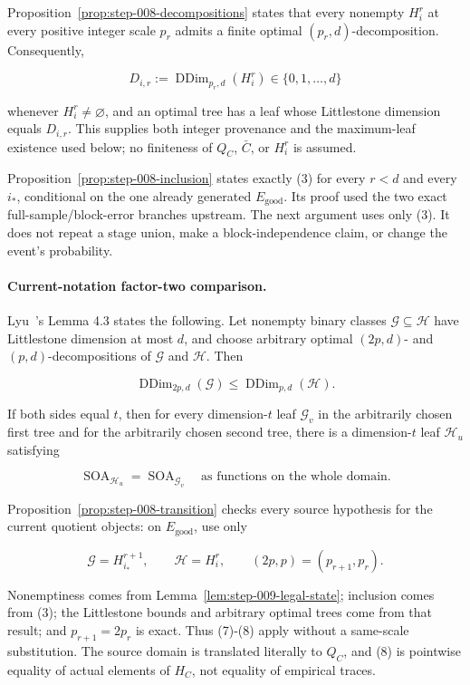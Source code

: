 Proposition~\ref{prop:step-008-decompositions} states that every
nonempty \(H_i^r\) at every positive integer scale \(p_r\) admits a finite
optimal \((p_r,d)\)-decomposition. Consequently,

\[
 D_{i,r}:=\operatorname{DDim}_{p_r,d}(H_i^r)
 \in\{0,1,\ldots,d\}
 \tag{6}
\]

whenever \(H_i^r\ne\varnothing\), and an optimal tree has a leaf whose
Littlestone dimension equals \(D_{i,r}\). This supplies both integer
provenance and the maximum-leaf existence used below; no finiteness of
\(Q_C\), \(\bar C\), or \(H_i^r\) is assumed.

Proposition~\ref{prop:step-008-inclusion} states exactly (3) for
every \(r<d\) and every \(i_*\), conditional on the one already generated
\(E_{\mathrm{good}}\). Its proof used the two exact full-sample/block-error
branches upstream. The next argument uses only (3). It does not repeat a stage
union, make a block-independence claim, or change the event's probability.

\paragraph{Current-notation factor-two comparison.}

Lyu~\citep{lyu2025}'s Lemma 4.3 states the
following. Let nonempty binary classes
\(\mathcal G\subseteq\mathcal H\) have Littlestone dimension at most \(d\),
and choose arbitrary optimal \((2p,d)\)- and \((p,d)\)-decompositions of
\(\mathcal G\) and \(\mathcal H\). Then

\[
 \operatorname{DDim}_{2p,d}(\mathcal G)
 \leq\operatorname{DDim}_{p,d}(\mathcal H).
 \tag{7}
\]

If both sides equal \(t\), then for every dimension-\(t\) leaf
\(\mathcal G_v\) in the arbitrarily chosen first tree and for the
arbitrarily chosen second tree, there is a dimension-\(t\) leaf
\(\mathcal H_u\) satisfying

\[
 \operatorname{SOA}_{\mathcal H_u}
 =\operatorname{SOA}_{\mathcal G_v}
 \quad\text{as functions on the whole domain}.
 \tag{8}
\]

Proposition~\ref{prop:step-008-transition} checks every source
hypothesis for the current quotient objects: on \(E_{\mathrm{good}}\), use
only

\[
 \mathcal G=H_{i_*}^{r+1},\qquad
 \mathcal H=H_i^r,\qquad
 (2p,p)=(p_{r+1},p_r).
 \tag{9}
\]

Nonemptiness comes from Lemma~\ref{lem:step-009-legal-state}; inclusion
comes from (3); the Littlestone bounds and arbitrary optimal trees come
from that result; and \(p_{r+1}=2p_r\) is exact. Thus (7)-(8)
apply without a same-scale substitution. The source domain is translated
literally to \(Q_C\), and (8) is pointwise equality of actual elements of
\(H_C\), not equality of empirical traces.


